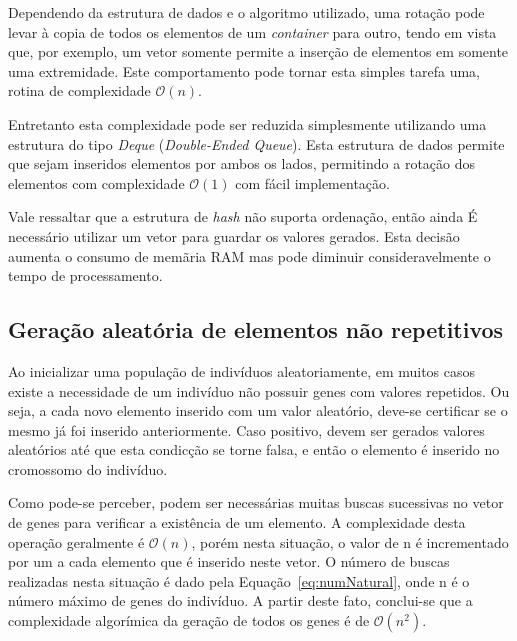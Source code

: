 \documentclass[12pt]{article}
\begin{document}
Dependendo da estrutura de dados e o algoritmo utilizado, uma rota\c{c}\~{a}o pode levar \`{a}
copia de todos os elementos de um \textit{container} para outro, tendo em vista que, por exemplo,
um vetor somente permite a inser\c{c}\~{a}o de elementos em somente uma extremidade. Este
comportamento pode tornar esta simples tarefa uma, rotina de complexidade $\mathcal{O}(n)$.

Entretanto esta complexidade pode ser reduzida simplesmente utilizando uma estrutura do tipo
\textit{Deque} (\textit{Double-Ended Queue}). Esta estrutura de dados permite que sejam inseridos
elementos por ambos os lados, permitindo a rota\c{c}\~{a}o dos elementos com complexidade
$\mathcal{O}(1)$ com f\'{a}cil implementa\c{c}\~{a}o.

Vale ressaltar que a estrutura de \textit{hash} n\~{a}o suporta ordena\c{c}\~{a}o, ent\~{a}o
ainda \'{E} necess\'{a}rio utilizar um vetor para guardar os valores gerados. Esta decis\~{a}o
aumenta o consumo de mem\~{a}ria RAM mas pode diminuir consideravelmente o tempo de processamento.

\subsection{Gera\c{c}\~{a}o aleat\'{o}ria de elementos n\~{a}o repetitivos}\label{sec:nonRepeating}

Ao inicializar uma popula\c{c}\~{a}o de indiv\'{i}duos aleatoriamente, em muitos casos existe
a necessidade de um indiv\'{i}duo n\~{a}o possuir genes com valores repetidos. Ou seja, a cada novo
elemento inserido com um valor aleat\'{o}rio, deve-se certificar se o mesmo j\'{a} foi inserido
anteriormente. Caso positivo, devem ser gerados valores aleat\'{o}rios at\'{e} que esta
condic\c{c}\~{a}o se torne falsa, e ent\~{a}o o elemento \'{e} inserido no cromossomo do indiv\'{i}duo.

Como pode-se perceber, podem ser necess\'{a}rias muitas buscas sucessivas no vetor de genes para verificar
a exist\^{e}ncia de um elemento. A complexidade desta opera\c{c}\~{a}o geralmente \'{e} $\mathcal{O}(n)$,
por\'{e}m nesta situa\c{c}\~{a}o, o valor de n \'{e} incrementado por um a cada elemento que \'{e} inserido
neste vetor. O n\'{u}mero de buscas realizadas nesta situa\c{c}\~{a}o \'{e} dado pela
Equa\c{c}\~{a}o~\ref{eq:numNatural}, onde n \'{e} o n\'{u}mero m\'{a}ximo de genes do indiv\'{i}duo. A partir
deste fato, conclui-se que a complexidade algor\'{i}mica da gera\c{c}\~{a}o de todos os genes \'{e} de
$\mathcal{O}(n^2)$.
\end{document}
